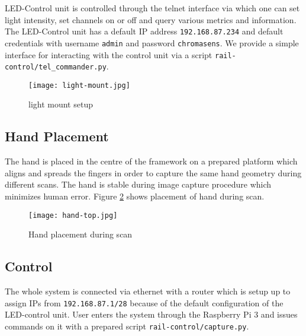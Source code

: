 LED-Control unit is controlled through the telnet interface via which one can set light intensity, set channels on or off and query various metrics and information. The LED-Control unit has a default IP address \texttt{192.168.87.234} and default credentials with username \texttt{admin} and password \texttt{chromasens}. We provide a simple interface for interacting with the control unit via a script \texttt{rail-control/tel\_commander.py}.

\begin{figure}[ht!]
    \label{fig:light-mount}
    \centering
    \texttt{[image: light-mount.jpg]}
    \caption{light mount setup}
\end{figure}

\subsection{Hand Placement}
The hand is placed in the centre of the framework on a prepared platform which aligns and spreads the fingers in order to
capture the same hand geometry during different scans. The hand is stable during image capture procedure which minimizes human error.
Figure \ref{fig:hand-placement} shows placement of hand during scan.

\begin{figure}[ht]
    \label{fig:hand-placement}
    \centering
    \texttt{[image: hand-top.jpg]}
    \caption{Hand placement during scan}
\end{figure}

\subsection{Control}
The whole system is connected via ethernet with a router which is setup up to assign IPs from \texttt{192.168.87.1/28} because of the default configuration of the LED-control unit. User enters the system through the Raspberry Pi 3 and issues commands on it with a prepared script \texttt{rail-control/capture.py}.

